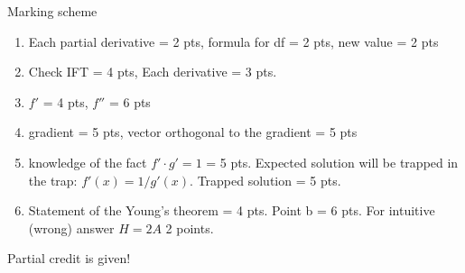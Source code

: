 \documentclass[12pt,a4paper]{article}
\begin{document}
Marking scheme

\begin{enumerate}

\item Each partial derivative = 2 pts, formula for df = 2 pts, new value = 2 pts

\item Check IFT = 4 pts, Each derivative = 3 pts.

\item $f'$ = 4 pts, $f''$ = 6 pts

\item gradient = 5 pts, vector orthogonal to the gradient = 5 pts

\item knowledge of the fact $f' \cdot g' = 1$ = 5 pts. Expected solution will be trapped in the trap: $f'(x)=1/g'(x)$. Trapped solution = 5 pts.

\item Statement of the Young's theorem = 4 pts. Point b = 6 pts. For intuitive (wrong) answer $H=2A$ 2 points.

\end{enumerate}

Partial credit is given!
\end{document}
